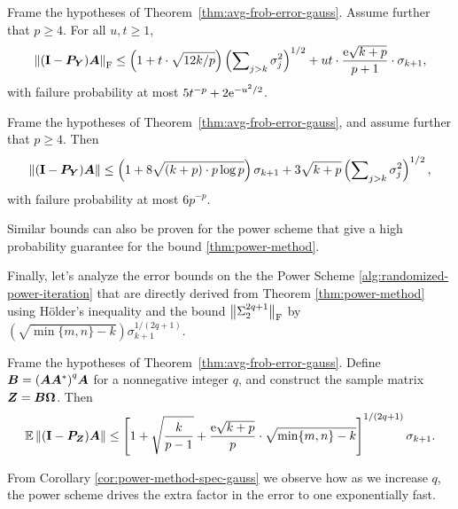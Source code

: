 \begin{theorem} \label{thm:tail-frob-error-gauss}
Frame the hypotheses of Theorem~\ref{thm:avg-frob-error-gauss}.
Assume further that $p \geq 4$.  For all $u, t \geq 1$,
$$
\fnorm{ (\Id - \mtx{P}_{\mtx{Y}}) \mtx{A} }
    \leq \left( 1 + t \cdot \sqrt{12k/p} \right)
    \left( \sum\nolimits_{j > k} \sigma_j^2 \right)^{1/2}
    + ut \cdot \frac{\econst\sqrt{k+p}}{p+1} \cdot \sigma_{k+1},
$$
with failure probability at most $5 t^{-p} + 2 \econst^{-u^2/2}$.
\end{theorem}

\begin{theorem} \label{thm:tail-spec-error-gauss}
Frame the hypotheses of Theorem~\ref{thm:avg-frob-error-gauss}, and assume further that $p \geq 4$.  Then
$$
\norm{ (\Id - \mtx{P}_{\mtx{Y}}) \mtx{A} }
    \leq \left( 1 + 8 \sqrt{(k + p) \cdot p \log p} \right) \sigma_{k+1}
        + 3 \sqrt{k+p} \left( \sum\nolimits_{j > k} \sigma_j^2 \right)^{1/2},
$$
with failure probability at most $6 p^{-p}$.
\end{theorem}
Similar bounds can also be proven for the power scheme 
\cite{halko2011finding} that give a high probability guarantee for 
the bound \ref{thm:power-method}.

Finally, let's analyze the error bounds on the 
the Power Scheme \ref{alg:randomized-power-iteration} that are directly
derived from Theorem \ref{thm:power-method} using H{\"o}lder's inequality
and the bound $\smnorm{\rm F}{\Sigma_2^{2q+1}}$ by 
$\left(\sqrt{ \min\{m,n\} - k }\right)\sigma_{k+1}^{1/(2q+1)}$.

\begin{corollary}
\label{cor:power-method-spec-gauss}
Frame the hypotheses of Theorem~\ref{thm:avg-frob-error-gauss}.
Define $\mtx{B} = {(\mtx{A}\mtx{A}^\adj)}^{q} \mtx{A}$ for a
nonnegative integer $q$, and construct the sample matrix $\mtx{Z} =
\mtx{B\Omega}$.  Then
$$
\Expect \norm{(\Id - \mtx{P}_{\mtx{Z}}) \mtx{A}}
    \leq \left[ 1 + \sqrt{\frac{k}{p-1}}
    + \frac{\econst\sqrt{k+p}}{p} \cdot \sqrt{ \min\{m,n\} - k } \right]^{1/(2q+1)}
    \sigma_{k+1}.
$$
\end{corollary}

From Corollary \ref{cor:power-method-spec-gauss} we observe how as we increase
$q$, the power scheme drives the extra factor in the error to one
exponentially fast.
\newpage